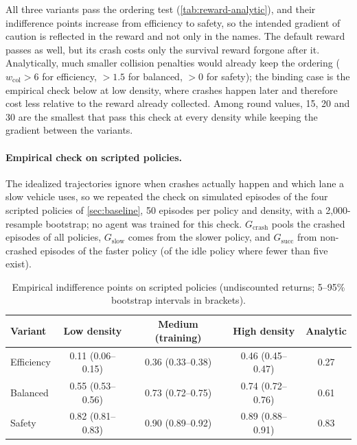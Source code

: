 All three variants pass the ordering test (\cref{tab:reward-analytic}), and their indifference points increase from
efficiency to safety, so the intended gradient of caution is reflected in the reward and not only in the names. The
default reward passes as well, but its crash costs only the survival reward forgone after it. Analytically, much
smaller collision penalties would already keep the ordering ($w_{\mathrm{col}} > 6$ for efficiency, $> 1.5$ for
balanced, $> 0$ for safety); the binding case is the empirical check below at low density, where crashes happen later
and therefore cost less relative to the reward already collected. Among round values, 15, 20 and 30 are the smallest
that pass this check at every density while keeping the gradient between the variants.

\paragraph{Empirical check on scripted policies.}
The idealized trajectories ignore when crashes actually happen and which lane a slow vehicle uses, so we repeated the
check on simulated episodes of the four scripted policies of \cref{sec:baseline}, 50 episodes per policy and
density, with a 2,000-resample bootstrap; no agent was trained for this check. $G_{\mathrm{crash}}$ pools the crashed
episodes of all policies, $G_{\mathrm{slow}}$ comes from the slower policy, and $G_{\mathrm{succ}}$ from non-crashed
episodes of the faster policy (of the idle policy where fewer than five exist).

\begin{table}[H]
  \centering
  \small
  \caption{Empirical indifference points on scripted policies (undiscounted returns; 5--95\% bootstrap intervals in
  brackets).}
  \label{tab:reward-empirical}
  \begin{tabular}{@{}lcccc@{}}
    \toprule
    Variant & Low density & Medium (training) & High density & Analytic \\
    \midrule
    Efficiency & 0.11 (0.06--0.15) & 0.36 (0.33--0.38) & 0.46 (0.45--0.47) & 0.27 \\
    Balanced   & 0.55 (0.53--0.56) & 0.73 (0.72--0.75) & 0.74 (0.72--0.76) & 0.61 \\
    Safety     & 0.82 (0.81--0.83) & 0.90 (0.89--0.92) & 0.89 (0.88--0.91) & 0.83 \\
    \bottomrule
  \end{tabular}
\end{table}

